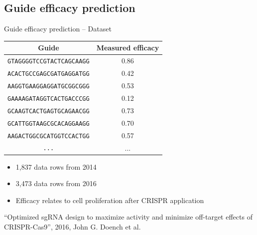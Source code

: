 \documentclass[Nike]{tuberlinbeamer}
\begin{document}
\subsection{Guide efficacy prediction}

\begin{frame}{Guide efficacy prediction -- Dataset}
\begin{table}[]
    \centering
    \begin{tabular}{cc}
        \textbf{Guide} & \textbf{Measured efficacy} \\ \hline
\texttt{GTAGGGGTCCGTACTCAGCAAGG} & 0.86 \\
\texttt{ACACTGCCGAGCGATGAGGATGG} & 0.42 \\
\texttt{AAGGTGAAGGAGGATGCGGCGGG} & 0.53 \\
\texttt{GAAAAGATAGGTCACTGACCCGG} & 0.12 \\
\texttt{GCAAGTCACTGAGTGCAGAACGG} & 0.73 \\
\texttt{GCATTGGTAAGCGCACAGGAAGG} & 0.70 \\
\texttt{AAGACTGGCGCATGGTCCACTGG} & 0.57 \\
\texttt{...} & ... \\
    \end{tabular}
\end{table}
\begin{itemize}
  \item 1,837 data rows from 2014
  \item 3,473 data rows from 2016
  \item Efficacy relates to cell proliferation after CRISPR application
\end{itemize}
\begin{flushright}
  \tiny
  ``Optimized sgRNA design to maximize activity and minimize off-target effects of CRISPR-Cas9'', 2016, John G. Doench et al.\
\end{flushright}
\end{frame}
\end{document}
